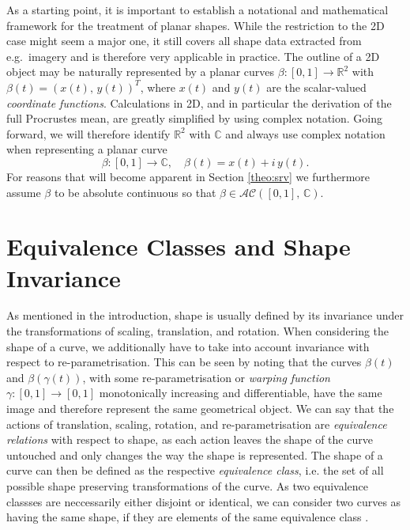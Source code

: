 As a starting point, it is important to establish a notational and mathematical framework for the treatment of planar shapes.
While the restriction to the 2D case might seem a major one, it still covers all shape data extracted from e.g.\ imagery and is therefore very applicable in practice.
The outline of a 2D object may be naturally represented by a planar curves $\beta : [0,1] \rightarrow \mathbb{R}^2$ with $\beta(t) = (x(t),\, y(t))^T$, where $x(t)$ and $y(t)$ are the scalar-valued \textit{coordinate functions}.
Calculations in 2D, and in particular the derivation of the full Procrustes mean, are greatly simplified by using complex notation.
Going forward, we will therefore identify $\mathbb{R}^2$ with $\mathbb{C}$ and always use complex notation when representing a planar curve
$$\beta : [0,1] \rightarrow \mathbb{C}, \quad \beta(t) = x(t) + i\, y(t).$$
For reasons that will become apparent in Section \ref{theo:srv} we furthermore assume $\beta$ to be absolute continuous so that $\beta \in \mathcal{AC}([0,1],\, \mathbb{C})$.



\section{Equivalence Classes and Shape Invariance}
\label{theo:inv}
As mentioned in the introduction, shape is usually defined by its invariance under the transformations of scaling, translation, and rotation.
When considering the shape of a curve, we additionally have to take into account invariance with respect to re-parametrisation.
This can be seen by noting that the curves $\beta(t)$ and $\beta(\gamma(t))$, with some re-parametrisation or \textit{warping function} $\gamma : [0,1] \rightarrow [0,1]$ monotonically increasing and differentiable, have the same image and therefore represent the same geometrical object.
We can say that the actions of translation, scaling, rotation, and re-parametrisation are \textit{equivalence relations} with respect to shape, as each action leaves the shape of the curve untouched and only changes the way the shape is represented.
The shape of a curve can then be defined as the respective \textit{equivalence class}, i.e. the set of all possible shape preserving transformations of the curve.
As two equivalence classses are neccessarily either disjoint or identical, we can consider two curves as having the same shape, if they are elements of the same equivalence class \parencite[see][40]{SrivastavaKlassen2016}.

